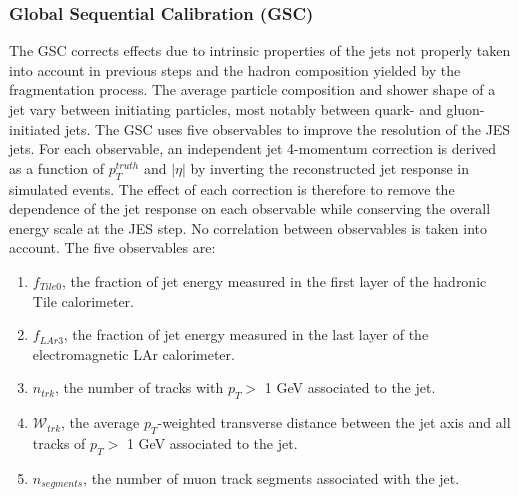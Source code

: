 \subsubsection{Global Sequential Calibration (GSC)}
\label{Jet:Cal:chain:GSC}
The GSC corrects effects due to intrinsic properties of the jets not properly taken into account in previous steps and the hadron composition yielded by the fragmentation process. The average particle composition and shower shape of a jet vary between initiating particles, most notably between quark- and gluon-initiated jets. The GSC uses five observables to improve the resolution of the JES jets. For each observable, an independent jet 4-momentum correction is derived as a function of $p_{T}^{truth}$ and $|\eta|$ by inverting the reconstructed jet response in simulated events. The effect of each correction is therefore to remove the dependence of the jet response on each observable while conserving the overall energy scale at the JES step. No correlation between observables is taken into account. The five observables are:
\begin{enumerate}
    \item $f_{Tile0}$, the fraction of jet energy measured in the first layer of the hadronic Tile calorimeter.
    \item $f_{LAr3}$, the fraction of jet energy measured in the last layer of the electromagnetic LAr calorimeter.
    \item $n_{trk}$, the number of tracks with $p_T>$ 1 GeV associated to the jet.
    \item $\mathcal{W}_{trk}$, the average $p_T$-weighted transverse distance between the jet axis and all tracks of $p_T>$ 1 GeV associated to the jet.
    \item $n_{segments}$, the number of muon track segments associated with the jet.
\end{enumerate}

